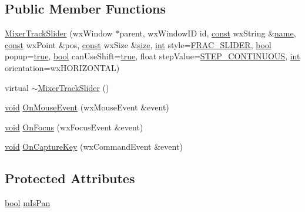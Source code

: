 \subsection*{Public Member Functions}
\begin{DoxyCompactItemize}
\item 
\hyperlink{class_mixer_track_slider_aec023bfee16e071fb17d039cd533d7ff}{Mixer\+Track\+Slider} (wx\+Window $\ast$parent, wx\+Window\+ID id, \hyperlink{getopt1_8c_a2c212835823e3c54a8ab6d95c652660e}{const} wx\+String \&\hyperlink{lib_2expat_8h_a1b49b495b59f9e73205b69ad1a2965b0}{name}, \hyperlink{getopt1_8c_a2c212835823e3c54a8ab6d95c652660e}{const} wx\+Point \&pos, \hyperlink{getopt1_8c_a2c212835823e3c54a8ab6d95c652660e}{const} wx\+Size \&\hyperlink{group__lavu__mem_ga854352f53b148adc24983a58a1866d66}{size}, \hyperlink{xmltok_8h_a5a0d4a5641ce434f1d23533f2b2e6653}{int} style=\hyperlink{_a_slider_8h_a499734eb1058aff0b262a6c7a7464eee}{F\+R\+A\+C\+\_\+\+S\+L\+I\+D\+ER}, \hyperlink{mac_2config_2i386_2lib-src_2libsoxr_2soxr-config_8h_abb452686968e48b67397da5f97445f5b}{bool} popup=\hyperlink{mac_2config_2i386_2lib-src_2libsoxr_2soxr-config_8h_a41f9c5fb8b08eb5dc3edce4dcb37fee7}{true}, \hyperlink{mac_2config_2i386_2lib-src_2libsoxr_2soxr-config_8h_abb452686968e48b67397da5f97445f5b}{bool} can\+Use\+Shift=\hyperlink{mac_2config_2i386_2lib-src_2libsoxr_2soxr-config_8h_a41f9c5fb8b08eb5dc3edce4dcb37fee7}{true}, float step\+Value=\hyperlink{_a_slider_8h_a5a134b38508842241d79758ee7f69ae3}{S\+T\+E\+P\+\_\+\+C\+O\+N\+T\+I\+N\+U\+O\+US}, \hyperlink{xmltok_8h_a5a0d4a5641ce434f1d23533f2b2e6653}{int} orientation=wx\+H\+O\+R\+I\+Z\+O\+N\+T\+AL)
\item 
virtual \hyperlink{class_mixer_track_slider_ac4b372d18d4c84804b1763a3e1d28602}{$\sim$\+Mixer\+Track\+Slider} ()
\item 
\hyperlink{sound_8c_ae35f5844602719cf66324f4de2a658b3}{void} \hyperlink{class_mixer_track_slider_a5e71baffeee50a9895247d0cb41bfc8b}{On\+Mouse\+Event} (wx\+Mouse\+Event \&event)
\item 
\hyperlink{sound_8c_ae35f5844602719cf66324f4de2a658b3}{void} \hyperlink{class_mixer_track_slider_a502e8e5b4c95c81d912060fa43df2a14}{On\+Focus} (wx\+Focus\+Event \&event)
\item 
\hyperlink{sound_8c_ae35f5844602719cf66324f4de2a658b3}{void} \hyperlink{class_mixer_track_slider_a1e7e042331bae4d04dab95f1b72d3841}{On\+Capture\+Key} (wx\+Command\+Event \&event)
\end{DoxyCompactItemize}
\subsection*{Protected Attributes}
\begin{DoxyCompactItemize}
\item 
\hyperlink{mac_2config_2i386_2lib-src_2libsoxr_2soxr-config_8h_abb452686968e48b67397da5f97445f5b}{bool} \hyperlink{class_mixer_track_slider_a56ba314de3e2af3c9d815e1847b94e1a}{m\+Is\+Pan}
\end{DoxyCompactItemize}


